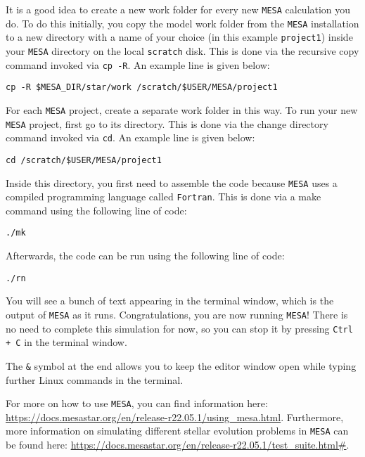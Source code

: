 \documentclass[11pt,a4paper]{article}
\begin{document}
It is a good idea to create a new work folder for every new \texttt{MESA} calculation you do. To do this initially, you copy the model work folder from the \texttt{MESA} installation to a new directory with a name of your choice (in this example \texttt{project1}) inside your \texttt{MESA} directory on the local \texttt{scratch} disk. This is done via the recursive copy command invoked via \texttt{cp -R}. An example line is given below:

\begin{lstlisting}
cp -R $MESA_DIR/star/work /scratch/$USER/MESA/project1
\end{lstlisting}

\noindent
For each \texttt{MESA} project, create a separate work folder in this way. To run your new \texttt{MESA} project, first go to its directory. This is done via the change directory command invoked via \texttt{cd}. An example line is given below:

\begin{lstlisting}
cd /scratch/$USER/MESA/project1
\end{lstlisting}

\noindent
Inside this directory, you first need to assemble the code because \texttt{MESA} uses a compiled programming language called \texttt{Fortran}. This is done via a make command using the following line of code: 

\begin{lstlisting}
./mk
\end{lstlisting}

\noindent
Afterwards, the code can be run using the following line of code: 

\begin{lstlisting}
./rn
\end{lstlisting}

\noindent
You will see a bunch of text appearing in the terminal window, which is the output of \texttt{MESA} as it runs. Congratulations, you are now running \texttt{MESA}!
There is no need to complete this simulation for now, so you can stop it by pressing \texttt{Ctrl + C} in the terminal window.



\noindent
The \texttt{\&} symbol at the end allows you to keep the editor window open while typing further Linux commands in the terminal.

\bigskip\noindent
For more on how to use \texttt{MESA}, you can find information here: \url{https://docs.mesastar.org/en/release-r22.05.1/using_mesa.html}. Furthermore, more information on simulating different stellar evolution problems in \texttt{MESA} can be found here: \url{https://docs.mesastar.org/en/release-r22.05.1/test_suite.html#}.
\end{document}

